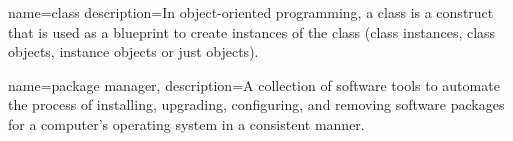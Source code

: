 {
    name=class
    description={In object-oriented programming, a class is a construct that is used as a blueprint to create instances of the class (class instances, class objects, instance objects or just objects).\cite{website:wikipedia}}
}

{
    name=package manager,
    description={A collection of software tools to automate the process of installing, upgrading, configuring, and removing software packages for a computer's operating system in a consistent manner.\cite{website:wikipedia}}

}
